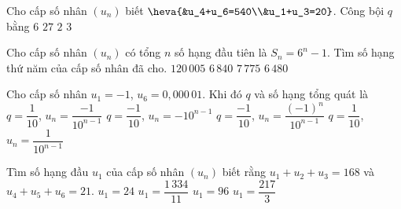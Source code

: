 \begin{ex}%
	Cho cấp số nhân $(u_n)$ biết $\heva{&u_4+u_6=540\\&u_1+u_3=20}$.  Công bội $q$ bằng
	 \choice
		 {$6$}
		{$27$} 
		{$2$} 
		{\True  $3$}
\end{ex}

\begin{ex}%
	Cho cấp số nhân $(u_n)$ có tổng  $n$ số hạng đầu tiên là $S_n=6^n-1$. Tìm số hạng thứ năm của cấp số nhân đã cho.
	\choice 
		 {$120\,005$}
		{$6\,840$} 
		 {$7\,775$}
		{\True  $6\,480$}
\end{ex}

\begin{ex}%
	 Cho cấp số nhân $u_1=-1$, $u_6=0,000\,01$. Khi đó $q$ và số hạng tổng quát là
	 \choice
		 {$q=\dfrac{1}{10}$, $u_n=\dfrac{-1}{10^{n-1}}$}
		 {$q=\dfrac{-1}{10}$, $u_n=-10^{n-1}$}
		{\True $q=\dfrac{-1}{10}$, $u_n=\dfrac{\left(-1\right)^n}{10^{n-1}}$} 
		 {$q=\dfrac{1}{10}$, $u_n=\dfrac{1}{10^{n-1}}$}
\end{ex}

\begin{ex}%
	Tìm số  hạng đầu $u_1$ của cấp số nhân $(u_n)$ biết rằng $u_1+u_2+u_3=168$ và $u_4+u_5+u_6=21$.
	\choice 
		{$u_1=24$} 
		{$u_1=\dfrac{1\,334}{11}$} 
		{\True  $u_1=96$}
		{$u_1=\dfrac{217}{3}$} 
\end{ex}

